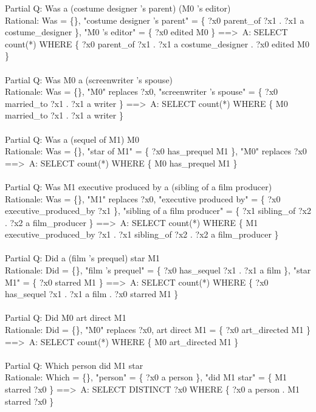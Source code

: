\documentclass{article} \usepackage{iclr2022_conference,times}
\newcommand{\prompt}[1]{{\footnotesize \textsf{#1}}}
\begin{document}
\prompt{Partial Q: Was a (costume designer 's parent) (M0 's editor) \\
Rational: Was = \{\}, "costume designer 's parent" = \{ ?x0 parent\_of ?x1 . ?x1 a costume\_designer \}, "M0 's editor" = \{ ?x0 edited M0 \} ==\textgreater \  A: SELECT count(*) WHERE \{ ?x0 parent\_of ?x1 . ?x1 a costume\_designer . ?x0 edited M0 \} \\
 \\
Partial Q: Was M0 a (screenwriter 's spouse) \\
Rationale: Was = \{\}, "M0" replaces ?x0, "screenwriter 's spouse" = \{ ?x0 married\_to ?x1 . ?x1 a writer \} ==\textgreater \  A: SELECT count(*) WHERE \{ M0 married\_to ?x1 . ?x1 a writer \} \\
 \\
Partial Q: Was a (sequel of M1) M0 \\
Rationale: Was = \{\}, "star of M1" = \{ ?x0 has\_prequel M1 \}, "M0" replaces ?x0 ==\textgreater \  A: SELECT count(*) WHERE \{ M0 has\_prequel M1 \} \\
 \\
Partial Q: Was M1 executive produced by a (sibling of a film producer) \\
Rationale: Was = \{\}, "M1" replaces ?x0, "executive produced by" = \{ ?x0 executive\_produced\_by ?x1 \}, "sibling of a film producer" = \{ ?x1 sibling\_of ?x2 . ?x2 a film\_producer \} ==\textgreater \  A: SELECT count(*) WHERE \{ M1 executive\_produced\_by ?x1 . ?x1 sibling\_of ?x2 . ?x2 a film\_producer \} \\
 \\
Partial Q: Did a (film 's prequel) star M1 \\
Rationale: Did = \{\}, "film 's prequel" = \{ ?x0 has\_sequel ?x1 . ?x1 a film \}, "star M1" = \{ ?x0 starred M1 \} ==\textgreater \  A: SELECT count(*) WHERE \{ ?x0 has\_sequel ?x1 . ?x1 a film . ?x0 starred M1 \} \\
 \\
Partial Q: Did M0 art direct M1 \\
Rationale: Did = \{\}, "M0" replaces ?x0, art direct M1 = \{ ?x0 art\_directed M1 \} ==\textgreater \  A: SELECT count(*) WHERE \{ M0 art\_directed M1 \} \\
 \\
Partial Q: Which person did M1 star \\
Rationale: Which = \{\}, "person" = \{ ?x0 a person \}, "did M1 star" = \{ M1 starred ?x0 \} ==\textgreater \  A: SELECT DISTINCT ?x0 WHERE \{ ?x0 a person .  M1 starred ?x0 \} \\
}
\end{document}
